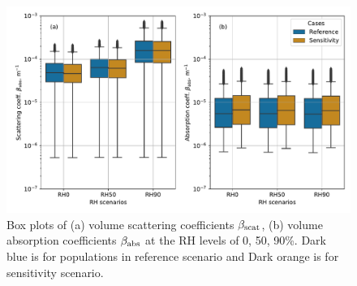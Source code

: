 \documentclass[edeposit,fullpage]{uiucthesis2009}
\begin{document}

\begin{figure}
	\centering
	\includegraphics[scale=0.50]{chap4_figs/fig9.pdf}
	\caption{Box plots of (a) volume scattering coefficients
          $\beta_{\rm scat}$, (b) volume absorption coefficients
          $\beta_{\rm abs}$ at the RH levels of 0, 50, 90\%. Dark blue
          is for populations in reference scenario and Dark orange is
          for sensitivity scenario.}
	\label{fig10:RH90-RH10-opt-scat}
\end{figure}
  
\end{document}
